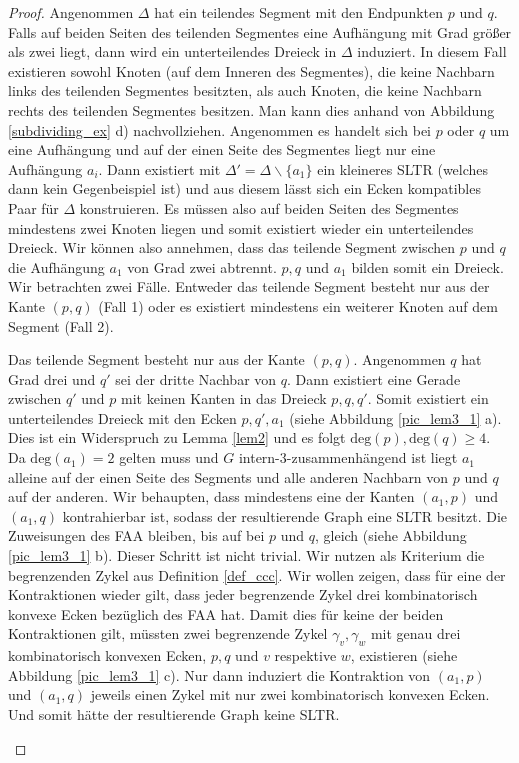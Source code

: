 \begin{proof}
Angenommen $\Delta$ hat ein teilendes Segment mit den Endpunkten $p$ und $q$. Falls auf beiden Seiten des teilenden Segmentes eine Aufhängung mit Grad größer als zwei liegt, dann wird ein unterteilendes Dreieck in $\Delta$ induziert. In diesem Fall existieren sowohl Knoten (auf dem Inneren des Segmentes), die keine Nachbarn links des teilenden Segmentes besitzten, als auch Knoten, die keine Nachbarn rechts des teilenden Segmentes besitzen. Man kann dies anhand von Abbildung \ref{subdividing_ex} d) nachvollziehen. Angenommen es handelt sich bei $p$ oder $q$ um eine Aufhängung und auf der einen Seite des Segmentes liegt nur eine Aufhängung $a_i$. Dann existiert mit $\Delta' = \Delta \backslash \{a_1\}$ ein kleineres SLTR (welches dann kein Gegenbeispiel ist) und aus diesem lässt sich ein Ecken kompatibles Paar für $\Delta$ konstruieren. Es müssen also auf beiden Seiten des Segmentes mindestens zwei Knoten liegen und somit existiert wieder ein unterteilendes Dreieck. Wir können also annehmen, dass das teilende Segment zwischen $p$ und $q$ die Aufhängung $a_1$ von Grad zwei abtrennt. $p,q$ und $a_1$ bilden somit ein Dreieck. Wir betrachten zwei Fälle. Entweder das teilende Segment besteht nur aus der Kante $(p,q)$ (Fall 1) oder es existiert mindestens ein weiterer Knoten auf dem Segment (Fall 2).

\begin{description}[leftmargin =0pt, font = \bfseries]
\item[Fall 1] Das teilende Segment besteht nur aus der Kante $(p,q)$. Angenommen $q$ hat Grad drei und $q'$ sei der dritte Nachbar von $q$. Dann existiert eine Gerade zwischen $q'$ und $p$ mit keinen Kanten in das Dreieck $p,q,q'$. Somit existiert ein unterteilendes Dreieck mit den Ecken $p,q',a_1$ (siehe Abbildung \ref{pic_lem3_1} a). Dies ist ein Widerspruch zu Lemma \ref{lem2} und es folgt $\text{deg}(p),\text{deg}(q) \geq 4$. Da $\text{deg}(a_1) = 2$ gelten muss und $G$ intern-3-zusammenhängend ist liegt $a_1$ alleine auf der einen Seite des Segments und alle anderen Nachbarn von $p$ und $q$ auf der anderen. 
Wir behaupten, dass mindestens eine der Kanten $(a_1,p)$ und $(a_1,q)$ kontrahierbar ist, sodass der resultierende Graph eine SLTR besitzt. Die Zuweisungen des FAA bleiben, bis auf bei $p$ und $q$, gleich (siehe Abbildung \ref{pic_lem3_1} b). Dieser Schritt ist nicht trivial. Wir nutzen als Kriterium die begrenzenden Zykel aus Definition \ref{def_ccc}. Wir wollen zeigen, dass für eine der Kontraktionen wieder gilt, dass jeder begrenzende Zykel drei kombinatorisch konvexe Ecken bezüglich des FAA hat. Damit dies für keine der beiden Kontraktionen gilt, müssten zwei begrenzende Zykel $\gamma_v,\gamma_w$ mit genau drei kombinatorisch konvexen Ecken, $p,q$ und $v$ respektive $w$, existieren (siehe Abbildung \ref{pic_lem3_1} c). Nur dann induziert die Kontraktion von $(a_1,p)$ und $(a_1,q)$ jeweils einen Zykel mit nur zwei kombinatorisch konvexen Ecken. Und somit hätte der resultierende Graph keine SLTR.


\end{description}
\end{proof}
